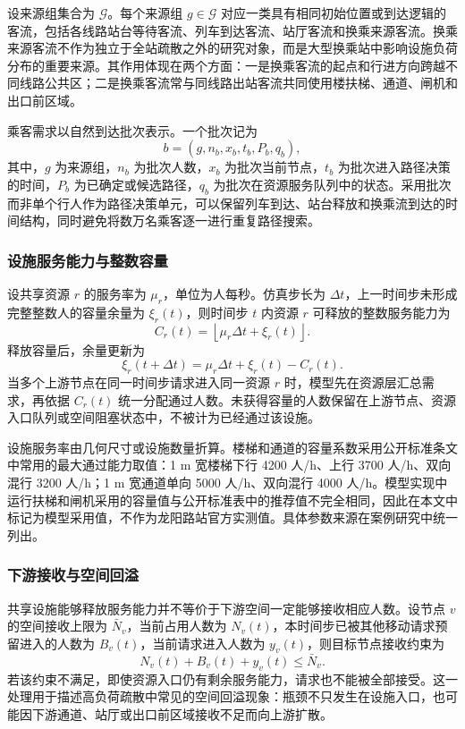 \documentclass[UTF8,a4paper,12pt]{ctexart}
\begin{document}
设来源组集合为 \(\mathcal{G}\)。每个来源组 \(g\in\mathcal{G}\) 对应一类具有相同初始位置或到达逻辑的客流，包括各线路站台等待客流、列车到达客流、站厅客流和换乘来源客流。换乘来源客流不作为独立于全站疏散之外的研究对象，而是大型换乘站中影响设施负荷分布的重要来源。其作用体现在两个方面：一是换乘客流的起点和行进方向跨越不同线路公共区；二是换乘客流常与同线路出站客流共同使用楼扶梯、通道、闸机和出口前区域。

乘客需求以自然到达批次表示。一个批次记为
\[
b=(g,n_b,x_b,t_b,P_b,q_b),
\]
其中，\(g\) 为来源组，\(n_b\) 为批次人数，\(x_b\) 为批次当前节点，\(t_b\) 为批次进入路径决策的时间，\(P_b\) 为已确定或候选路径，\(q_b\) 为批次在资源服务队列中的状态。采用批次而非单个行人作为路径决策单元，可以保留列车到达、站台释放和换乘流到达的时间结构，同时避免将数万名乘客逐一进行重复路径搜索。

\subsubsection{设施服务能力与整数容量}

设共享资源 \(r\) 的服务率为 \(\mu_r\)，单位为人每秒。仿真步长为 \(\Delta t\)，上一时间步未形成完整整数人的容量余量为 \(\xi_r(t)\)，则时间步 \(t\) 内资源 \(r\) 可释放的整数服务能力为
\[
C_r(t)=\left\lfloor \mu_r\Delta t+\xi_r(t)\right\rfloor .
\]
释放容量后，余量更新为
\[
\xi_r(t+\Delta t)=\mu_r\Delta t+\xi_r(t)-C_r(t).
\]
当多个上游节点在同一时间步请求进入同一资源 \(r\) 时，模型先在资源层汇总需求，再依据 \(C_r(t)\) 统一分配通过人数。未获得容量的人数保留在上游节点、资源入口队列或空间阻塞状态中，不被计为已经通过该设施。

设施服务率由几何尺寸或设施数量折算。楼梯和通道的容量系数采用公开标准条文中常用的最大通过能力取值：1 m 宽楼梯下行 4200 人/h、上行 3700 人/h、双向混行 3200 人/h；1 m 宽通道单向 5000 人/h、双向混行 4000 人/h。模型实现中运行扶梯和闸机采用的容量值与公开标准表中的推荐值不完全相同，因此在本文中标记为模型采用值，不作为龙阳路站官方实测值。具体参数来源在案例研究中统一列出。

\subsubsection{下游接收与空间回溢}

共享设施能够释放服务能力并不等价于下游空间一定能够接收相应人数。设节点 \(v\) 的空间接收上限为 \(\bar N_v\)，当前占用人数为 \(N_v(t)\)，本时间步已被其他移动请求预留进入的人数为 \(B_v(t)\)，当前请求进入人数为 \(y_v(t)\)，则目标节点接收约束为
\[
N_v(t)+B_v(t)+y_v(t)\leq \bar N_v .
\]
若该约束不满足，即使资源入口仍有剩余服务能力，请求也不能被全部接受。这一处理用于描述高负荷疏散中常见的空间回溢现象：瓶颈不只发生在设施入口，也可能因下游通道、站厅或出口前区域接收不足而向上游扩散。
\end{document}
